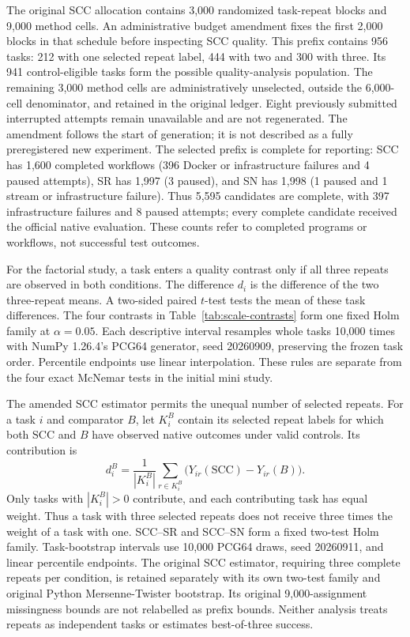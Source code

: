 The original SCC allocation contains 3,000 randomized task-repeat blocks and 9,000 method cells. An administrative budget amendment fixes the first 2,000 blocks in that schedule before inspecting SCC quality. This prefix contains 956 tasks: 212 with one selected repeat label, 444 with two and 300 with three. Its 941 control-eligible tasks form the possible quality-analysis population. The remaining 3,000 method cells are administratively unselected, outside the 6,000-cell denominator, and retained in the original ledger. Eight previously submitted interrupted attempts remain unavailable and are not regenerated. The amendment follows the start of generation; it is not described as a fully preregistered new experiment. The selected prefix is complete for reporting: SCC has 1,600 completed workflows (396 Docker or infrastructure failures and 4 paused attempts), SR has 1,997 (3 paused), and SN has 1,998 (1 paused and 1 stream or infrastructure failure). Thus 5,595 candidates are complete, with 397 infrastructure failures and 8 paused attempts; every complete candidate received the official native evaluation. These counts refer to completed programs or workflows, not successful test outcomes.

For the factorial study, a task enters a quality contrast only if all three repeats are observed in both conditions. The difference $d_i$ is the difference of the two three-repeat means. A two-sided paired $t$-test tests the mean of these task differences. The four contrasts in Table~\ref{tab:scale-contrasts} form one fixed Holm family at $\alpha=0.05$. Each descriptive interval resamples whole tasks 10,000 times with NumPy 1.26.4's PCG64 generator, seed 20260909, preserving the frozen task order. Percentile endpoints use linear interpolation. These rules are separate from the four exact McNemar tests in the initial mini study.

The amended SCC estimator permits the unequal number of selected repeats. For a task $i$ and comparator $B$, let $K_i^B$ contain its selected repeat labels for which both SCC and $B$ have observed native outcomes under valid controls. Its contribution is
\[
d_i^B=\frac{1}{|K_i^B|}\sum_{r\in K_i^B}
\bigl(Y_{ir}(\mathrm{SCC})-Y_{ir}(B)\bigr).
\]
Only tasks with $|K_i^B|>0$ contribute, and each contributing task has equal weight. Thus a task with three selected repeats does not receive three times the weight of a task with one. SCC--SR and SCC--SN form a fixed two-test Holm family. Task-bootstrap intervals use 10,000 PCG64 draws, seed 20260911, and linear percentile endpoints. The original SCC estimator, requiring three complete repeats per condition, is retained separately with its own two-test family and original Python Mersenne-Twister bootstrap. Its original 9,000-assignment missingness bounds are not relabelled as prefix bounds. Neither analysis treats repeats as independent tasks or estimates best-of-three success.

